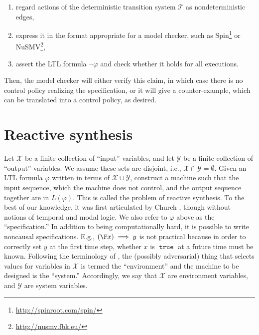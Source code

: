 \documentclass{amsart}
\DeclareMathOperator{\true}{\mathtt{true}}
\theoremstyle{plain}
\theoremstyle{definition}
\theoremstyle{definition}
\begin{document}
\begin{enumerate}
\item regard actions of the deterministic transition system $\mathcal{T}$ as nondeterministic edges,
\item express it in the format appropriate for a model checker, such as Spin\footnote{\url{http://spinroot.com/spin/}} or NuSMV\footnote{\url{http://nusmv.fbk.eu/}},
\item assert the LTL formula $\neg \varphi$ and check whether it holds for all executions.
\end{enumerate}
Then, the model checker will either verify this claim, in which case there is no
control policy realizing the specification, or it will give a counter-example,
which can be translated into a control policy, as desired.


\section{Reactive synthesis}\label{sec:reactsynth}

Let $\mathcal{X}$ be a finite collection of ``input'' variables, and let
$\mathcal{Y}$ be a finite collection of ``output'' variables.  We assume these
sets are disjoint, i.e., $\mathcal{X}\cap \mathcal{Y} = \emptyset$.
Given an LTL formula $\varphi$ written in terms of $\mathcal{X}\cup
\mathcal{Y}$, construct a machine such that the input sequence, which the
machine does not control, and the output sequence together are in $L(\varphi)$.
This is called the problem of reactive synthesis. To the best of our knowledge,
it was first articulated by Church \cite{Church1962}, though without notions of
temporal and modal logic.
We also refer to $\varphi$ above as the
``specification.''  In addition to being computationally hard, it is possible to
write noncausal specifications.  E.g., $(\F x) \implies y$ is not practical
because in order to correctly set $y$ at the first time step, whether $x$ is $\true$
at a future time must be known.  Following the terminology of
\cite{PnueliR1989}, the (possibly adversarial) thing that selects values for
variables in $\mathcal{X}$ is termed the ``environment'' and the machine to be
designed is the ``system.''  Accordingly, we say that $\mathcal{X}$ are
environment variables, and $\mathcal{Y}$ are system variables.
\end{document}
